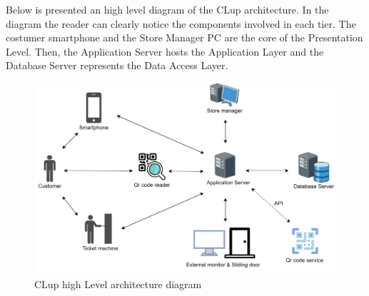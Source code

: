\documentclass[]{article}
\begin{document}
	\newpage
	\noindent
	Below is presented an high level diagram of the CLup architecture. In the diagram the reader can clearly notice the components involved in each tier.
	The costumer smartphone and the Store Manager PC are the core of the Presentation Level. Then, the Application Server hosts the Application Layer and the Database Server represents the Data Access Layer.
	\bigskip
	\bigskip
	\begin{figure}[H]
		\centering
		\includegraphics[scale=0.8]{HighLevelDiagram}
		\caption{CLup high Level architecture diagram}
	\end{figure}


\newpage
				

				
\end{document}
